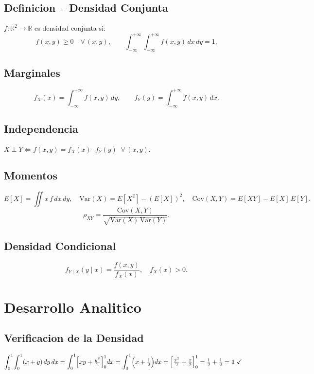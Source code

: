 \documentclass[12pt,a4paper]{article}
\begin{document}
\subsection{Definicion -- Densidad Conjunta}

$f:\mathbb{R}^{2}\to\mathbb{R}$ es densidad conjunta si:
\[
  f(x,y)\geq 0 \quad\forall\,(x,y), \qquad
  \int_{-\infty}^{+\infty}\!\int_{-\infty}^{+\infty} f(x,y)\,dx\,dy = 1.
\]

\subsection{Marginales}

\[
  f_X(x) = \int_{-\infty}^{+\infty} f(x,y)\,dy, \qquad
  f_Y(y) = \int_{-\infty}^{+\infty} f(x,y)\,dx.
\]

\subsection{Independencia}

$X\perp Y \iff f(x,y)=f_X(x)\cdot f_Y(y)\;\;\forall\,(x,y)$.

\subsection{Momentos}

\[
  E[X]=\iint x\,f\,dx\,dy,\quad
  \mathrm{Var}(X)=E[X^{2}]-(E[X])^{2},\quad
  \mathrm{Cov}(X,Y)=E[XY]-E[X]\,E[Y].
\]
\[
  \rho_{XY}=\frac{\mathrm{Cov}(X,Y)}{\sqrt{\mathrm{Var}(X)\,\mathrm{Var}(Y)}}.
\]

\subsection{Densidad Condicional}

\[
  f_{Y\mid X}(y\mid x) = \frac{f(x,y)}{f_X(x)},\quad f_X(x)>0.
\]

\section{Desarrollo Analitico}

\subsection{Verificacion de la Densidad}

\begin{align*}
  \int_0^1\!\int_0^1 (x+y)\,dy\,dx
  &=\int_0^1\Bigl[xy+\tfrac{y^2}{2}\Bigr]_0^1 dx
   =\int_0^1\Bigl(x+\tfrac{1}{2}\Bigr)dx
   =\Bigl[\tfrac{x^2}{2}+\tfrac{x}{2}\Bigr]_0^1
   =\tfrac{1}{2}+\tfrac{1}{2}=\mathbf{1}\;\checkmark
\end{align*}
\end{document}
